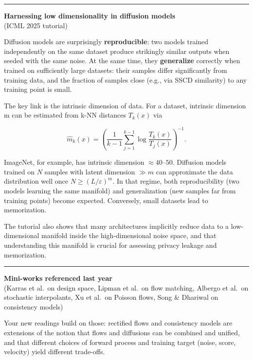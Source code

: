 \documentclass[a5paper]{article}
\let\ge\geqslant
\begin{document}
\begin{center}\rule{0.5\linewidth}{0.5pt}\end{center}

\textbf{Harnessing low dimensionality in diffusion models}\\
(ICML 2025 tutorial)

Diffusion models are surprisingly \textbf{reproducible}: two models
trained independently on the same dataset produce strikingly similar
outputs when seeded with the same noise. At the same time, they
\textbf{generalize} correctly when trained on sufficiently large
datasets: their samples differ significantly from training data, and the
fraction of samples close (e.g., via SSCD similarity) to any training
point is small.

The key link is the intrinsic dimension of data. For a dataset,
intrinsic dimension m can be estimated from k-NN distances $T_k(x)$ via

\[ \hat m_k(x) =
\left(\frac{1}{k-1}\sum_{j=1}^{k-1}\log \frac{T_k(x)}{T_j(x)}\right)^{-1}.
\]

ImageNet, for example, has intrinsic dimension $\approx 40$--$50$. Diffusion models
trained on $N$ samples with latent dimension $\gg m$ can approximate the data
distribution well once $N\ge (L/\varepsilon)^m$. In that regime, both
reproducibility (two models learning the same manifold) and
generalization (new samples far from training points) become expected.
Conversely, small datasets lead to memorization.

The tutorial also shows that many architectures implicitly reduce data
to a low-dimensional manifold inside the high-dimensional noise space,
and that understanding this manifold is crucial for assessing privacy
leakage and memorization.

\begin{center}\rule{0.5\linewidth}{0.5pt}\end{center}

\textbf{Mini-works referenced last year}\\
(Karras et al.~on design space, Lipman et al.~on flow matching, Albergo
et al.~on stochastic interpolants, Xu et al.~on Poisson flows, Song \&
Dhariwal on consistency models)

Your new readings build on those: rectified flows and consistency models
are extensions of the notion that flows and diffusions can be combined
and unified, and that different choices of forward process and training
target (noise, score, velocity) yield different trade-offs.
\end{document}
